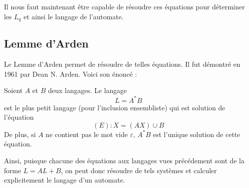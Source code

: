 Il nous faut maintenant être capable de résoudre ces équations pour déterminer les $L_q$ et ainsi le langage de l'automate. 

\subsection{Lemme d'Arden}

Le Lemme d'Arden permet de résoudre de telles équations. Il fut démontré en 1961 par Dean N. Arden. Voici son énoncé : 

\begin{lemma}[Arden]
    Soient $A$ et $B$ deux langages. Le langage 
        \[ \boxed{ L = A^*B } \]
    est le plus petit langage (pour l'inclusion ensembliste) qui est solution de l'équation 
        \[ \boxed{ (E) : X = (AX) \cup B } \] 
    De plus, si $A$ ne contient pas le mot vide $\varepsilon$, $A^*B$ est l'unique solution de cette équation. 
\end{lemma}

Ainsi, puisque chacune des équations aux langages vues précédement sont de la forme $ L = AL + B$, on peut donc 
résoudre de tels systèmes et calculer explicitement le langage d'un automate. 

